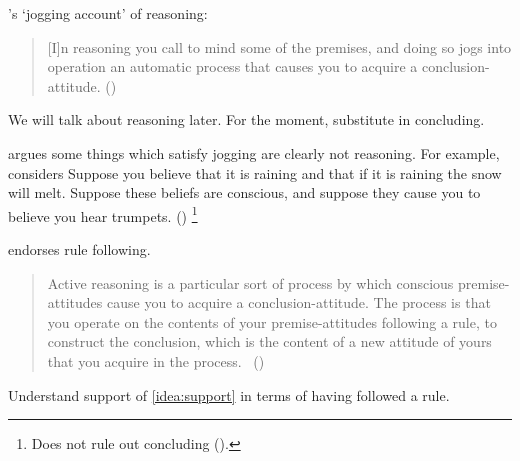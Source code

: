 \begin{note}
  \citeauthor{Broome:2002aa}'s `jogging account' of reasoning:

  \begin{quote}
    [I]n reasoning you call to mind some of the premises, and doing so jogs into operation an automatic process that causes you to acquire a conclusion-attitude.%
    \mbox{}\hfill\mbox{(\citeyear[226]{Broome:2002aa})}
  \end{quote}

  {
    \color{red}
    We will talk about reasoning later.
    For the moment, substitute in concluding.
    }

  \citeauthor{Broome:2002aa} argues some things which satisfy jogging are clearly not reasoning.
  For example, \citeauthor{Broome:2002aa} considers
  {
    \color{red}
    Suppose you believe that it is raining and that if it is raining the snow will melt. Suppose these beliefs are conscious, and suppose they cause you to believe you hear trumpets.
  }
  (\citeyear[225,226--227]{Broome:2002aa})%
  \footnote{
    Does not rule out concluding (\citeyear[231,233]{Broome:2002aa}).
  }

  \citeauthor{Broome:2002aa} endorses rule following.

  \begin{quote}
    Active reasoning is a particular sort of process by which conscious premise-attitudes cause you to acquire a conclusion-attitude.
    The process is that you operate on the contents of your premise-attitudes following a rule, to construct the conclusion, which is the content of a new attitude of yours that you acquire in the process.\newline
    \mbox{ }\hfill\mbox{(\citeyear[234]{Broome:2002aa})}
  \end{quote}

  Understand support of \autoref{idea:support} in terms of having followed a rule.
\end{note}

